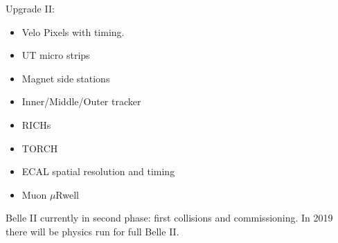 \documentclass[12pt]{article}
\begin{document}
Upgrade II:
\begin{itemize}
\item Velo Pixels with timing. 
\item UT micro strips
\item Magnet side stations
\item Inner/Middle/Outer tracker
\item RICHs
\item TORCH
\item ECAL spatial resolution and timing
\item Muon $\mu$Rwell
\end{itemize}


Belle II currently in second phase: first collisions and commissioning. In 2019 there will be physics run for full Belle II. 
\end{document}
